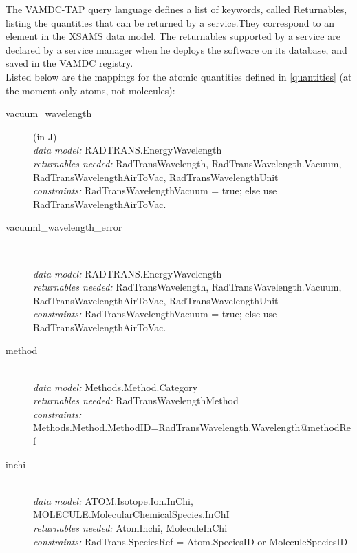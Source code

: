 \documentclass[11pt,a4paper]{ivoa}
\begin{document}
The VAMDC-TAP query language defines a list of keywords, called 
\href{https://standards.vamdc.eu/dictionary/returnables.html}{Returnables}, 
listing the quantities that 
can be returned by a service.They correspond to an element in the XSAMS data model. 
The returnables supported by a service are declared by a service manager when he 
deploys the software on its database, and saved in the VAMDC registry. \\

Listed below are the mappings for the atomic quantities defined in \ref{quantities} (at the 
moment only atoms, not molecules):

\renewcommand{\descriptionlabel}[1]{\hspace{\labelsep}\texttt{#1}}
\begin{description}

\item [vacuum\_wavelength] (in J)\hfill\\
    \textit{data model:} RADTRANS.EnergyWavelength\\
	\textit{returnables needed:} RadTransWavelength, RadTransWavelength.Vacuum, 
RadTransWavelengthAirToVac, RadTransWavelengthUnit\\
	\textit{constraints:} RadTransWavelengthVacuum = true; else use 
RadTransWavelengthAirToVac. \\
	
\item [vacuuml\_wavelength\_error]  \hfill\\

    \textit{data model:} RADTRANS.EnergyWavelength\\
	\textit{returnables needed:} RadTransWavelength, RadTransWavelength.Vacuum, 
RadTransWavelengthAirToVac, RadTransWavelengthUnit\\
	\textit{constraints:} RadTransWavelengthVacuum = true; else use 
RadTransWavelengthAirToVac.\\
	
\item [method] \hfill\\
	\textit{data model:} Methods.Method.Category\\
	\textit{returnables needed:} RadTransWavelengthMethod\\
	\textit{constraints:} 
Methods.Method.MethodID=RadTransWavelength.Wavelength@methodRef\\

\item [inchi] \hfill\\
	\textit{data model:} ATOM.Isotope.Ion.InChi,  
MOLECULE.MolecularChemicalSpecies.InChI\\
        \textit{returnables needed:} AtomInchi, MoleculeInChi\\
	\textit{constraints:} RadTrans.SpeciesRef = Atom.SpeciesID or MoleculeSpeciesID
	

\end{description}
\end{document}
